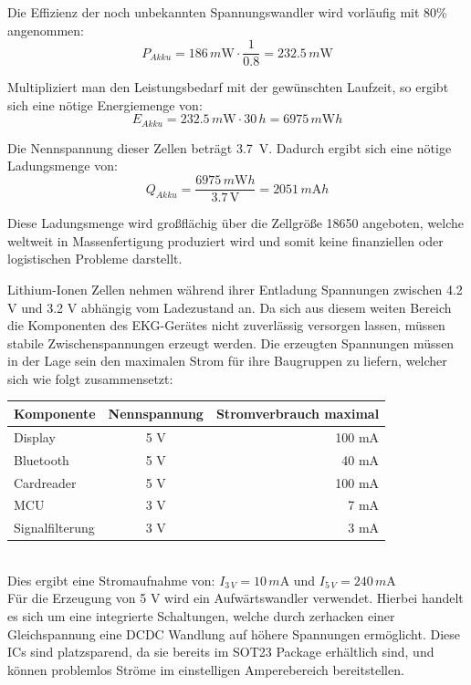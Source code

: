 Die Effizienz der noch unbekannten Spannungswandler wird vorläufig mit 80\% angenommen:
$$ P_{Akku} = 186\,m\mbox{W} \cdot \frac{1}{0.8} = 232.5\,m\mbox{W} $$

Multipliziert man den Leistungsbedarf mit der gewünschten Laufzeit, so ergibt sich eine nötige Energiemenge von:
$$ E_{Akku} = 232.5\,m\mbox{W} \cdot 30\,h = 6975\,m\mbox{W}h $$

Die Nennspannung dieser Zellen beträgt \SI{3,7}{\volt}. Dadurch ergibt sich eine nötige Ladungsmenge von: 
$$ Q_{Akku} = \frac{6975\,m \mbox{W} h}{3.7\,\mbox{V}} = 2051\,m\mbox{A}h $$

Diese Ladungsmenge wird großflächig über die Zellgröße 18650 angeboten, welche weltweit in Massenfertigung produziert wird und somit keine finanziellen oder logistischen Probleme darstellt.

Lithium-Ionen Zellen nehmen während ihrer Entladung Spannungen zwischen 4.2 V und 3.2 V abhängig vom Ladezustand an. Da sich aus diesem weiten Bereich die Komponenten des EKG-Gerätes nicht zuverlässig versorgen lassen, müssen stabile Zwischenspannungen erzeugt werden. Die erzeugten Spannungen müssen in der Lage sein den maximalen Strom für ihre Baugruppen zu liefern, welcher sich wie folgt zusammensetzt:\\

\begin{tabular}[h]{l|c|r}
Komponente & Nennspannung & Stromverbrauch maximal\\
\hline
Display & 5 V & 100 mA \\
Bluetooth & 5 V & 40 mA \\
Cardreader & 5 V & 100 mA \\
MCU & 3 V & 7 mA \\
Signalfilterung & 3  V & 3 mA \\
\end{tabular}\\
Dies ergibt eine Stromaufnahme von: $ I_{3\,V} = 10\,m\mbox{A}$ und $I_{5\,V} = 240\,m\mbox{A} $ \\

Für die Erzeugung von 5 V wird ein Aufwärtswandler verwendet. Hierbei handelt es sich um eine integrierte Schaltungen, welche durch zerhacken einer Gleichspannung eine DCDC Wandlung auf höhere Spannungen ermöglicht. Diese ICs sind platzsparend, da sie bereits im SOT23 Package erhältlich sind, und können problemlos Ströme im einstelligen Amperebereich bereitstellen. \\

